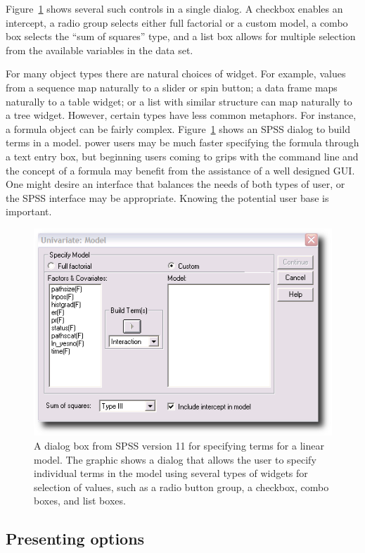Figure~\ref{fig:GUI:spss-11-term-selection} shows several such
controls in a single dialog. A checkbox enables an intercept,
a radio group selects either full factorial or a custom
model, a combo box selects the ``sum of squares'' type, and a
list box allows for multiple selection from the available
variables in the data set. 




For many \R\/ object types there are natural choices of widget. For
example, values from a sequence map naturally to a slider or spin
button; a data frame maps naturally to a table widget; or a list with
similar structure can map naturally to a tree widget. However, certain
\R\/ types have less common metaphors. For instance, a formula object
can be fairly complex. Figure~\ref{fig:GUI:spss-11-term-selection}
shows an SPSS dialog to build terms in a model. \R\/ power users may
be much faster specifying the formula through a text entry box, but
beginning \R\/ users coming to grips with the command line and the
concept of a formula may benefit from the assistance of a well
designed GUI. One might desire an interface that balances the needs of
both types of user, or the SPSS interface may be appropriate. Knowing
the potential user base is important.




\begin{figure}
  \centering
  \includegraphics[width=.65\textwidth]{spss-11-formula-editor}
 \caption{A dialog box from SPSS version 11 for specifying terms
    for a linear model. The graphic shows a dialog that allows
    the user to specify individual terms in the model  using
    several types of widgets for selection of values, such as a radio button
    group, a checkbox, combo boxes, and list boxes. }
  \label{fig:GUI:spss-11-term-selection}
\end{figure}


\subsection{Presenting options}
\label{sec:GUI:basic-selection}

